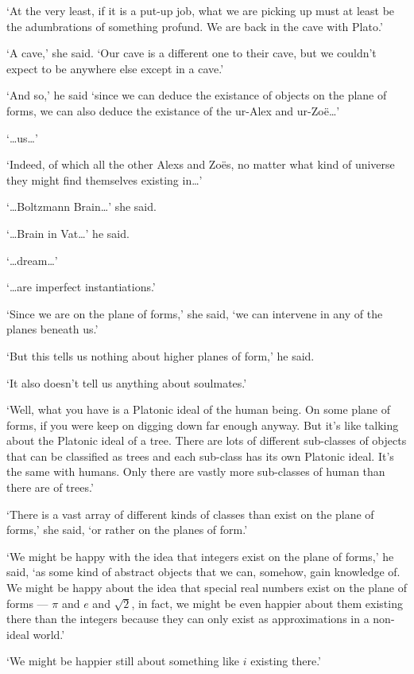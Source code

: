 `At the very least, if it is a put-up job, what we are picking up must at least be the adumbrations of something profund. We are back in the cave with Plato.'

`{\twelveit A\/} cave,' she said. `Our cave is a different one to their cave, but we couldn't expect to be anywhere else except in a cave.'

`And so,' he said `since we can deduce the existance of objects on the plane of forms, we can also deduce the existance of the ur-Alex and ur-Zo{\"e}\dots'

`{\dots}us{\dots}'

`Indeed, of which all the other Alexs and Zo{\"e}s, no matter what kind of universe they might find themselves existing in\dots'

`{\dots}Boltzmann Brain{\dots}' she said.

`{\dots}Brain in Vat{\dots}' he said.

`{\dots}dream{\dots}'

`{\dots}are imperfect instantiations.'

`Since we are on the plane of forms,' she said, `we can intervene in any of the planes beneath us.'

`But this tells us nothing about higher planes of form,' he said.

`It also doesn't tell us anything about soulmates.'

`Well, what you have is a Platonic ideal of the human being. On some plane of forms, if you were keep on digging down far enough anyway. But it's like talking about the Platonic ideal of a tree. There are lots of different sub-classes of objects that can be classified as trees and each sub-class has its own Platonic ideal. It's the same with humans. Only there are vastly more sub-classes of human than there are of trees.'

`There is a vast array of different kinds of classes than exist on the plane of forms,' she said, `or rather on the {\twelveit planes\/} of form.'

`We might be happy with the idea that integers exist on the plane of forms,' he said, `as some kind of abstract objects that we can, somehow, gain knowledge of. We might be happy about the idea that special real numbers exist on the plane of forms --- $\pi$ and $e$ and $\sqrt{2}$, in fact, we might be even happier about them existing there than the integers because they can only exist as approximations in a non-ideal world.'

`We might be happier still about something like $i$ existing there.'

